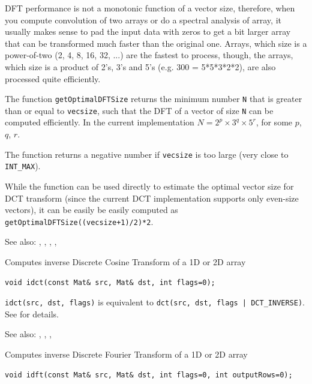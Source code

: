 DFT performance is not a monotonic function of a vector size, therefore, when you compute convolution of two arrays or do a spectral analysis of array, it usually makes sense to pad the input data with zeros to get a bit larger array that can be transformed much faster than the original one.
Arrays, which size is a power-of-two (2, 4, 8, 16, 32, ...) are the fastest to process, though, the arrays, which size is a product of 2's, 3's and 5's (e.g. 300 = 5*5*3*2*2), are also processed quite efficiently.

The function \texttt{getOptimalDFTSize} returns the minimum number \texttt{N} that is greater than or equal to \texttt{vecsize}, such that the DFT
of a vector of size \texttt{N} can be computed efficiently. In the current implementation $N=2^p \times 3^q \times 5^r$, for some $p$, $q$, $r$.

The function returns a negative number if \texttt{vecsize} is too large (very close to \texttt{INT\_MAX}).

While the function can be used directly to estimate the optimal vector size for DCT transform (since the current DCT implementation supports only even-size vectors), it can be easily be easily computed as \texttt{getOptimalDFTSize((vecsize+1)/2)*2}.

See also: , , , , 

\label{idct}
Computes inverse Discrete Cosine Transform of a 1D or 2D array

\begin{lstlisting}
void idct(const Mat& src, Mat& dst, int flags=0);
\end{lstlisting}
\begin{description}
\end{description}

\texttt{idct(src, dst, flags)} is equivalent to \texttt{dct(src, dst, flags | DCT\_INVERSE)}.
See  for details.

See also: , , , 


\label{idft}
Computes inverse Discrete Fourier Transform of a 1D or 2D array

\begin{lstlisting}
void idft(const Mat& src, Mat& dst, int flags=0, int outputRows=0);
\end{lstlisting}
\begin{description}
\end{description}

